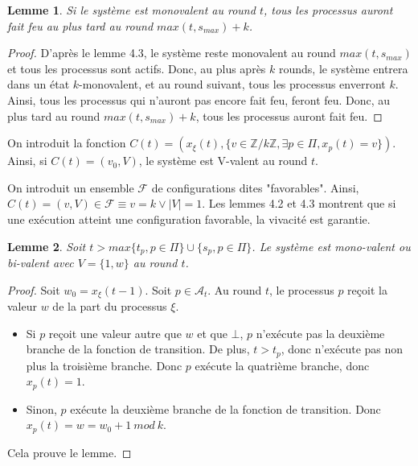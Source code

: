 \documentclass{article}
\newtheorem{lemma}{Lemme}[section]
\begin{document}
\begin{lemma}
	Si le système est monovalent au round $t$, tous les processus auront fait feu au plus tard au round $max(t, s_{max})+k$.
\end{lemma}
\begin{proof}
	D'après le lemme 4.3, le système reste monovalent au round $max(t, s_{max})$ et tous les processus sont actifs.
	Donc, au plus après $k$ rounds, le système entrera dans un état $k$-monovalent, et au round suivant, tous les processus enverront $k$.
	Ainsi, tous les processus qui n'auront pas encore fait feu, feront feu.
	Donc, au plus tard au round $max(t, s_{max})+k$, tous les processus auront fait feu.
\end{proof}

On introduit la fonction $C(t) = (x_\xi(t), \{v \in \mathds{Z}/k\mathds{Z}, \exists p \in \Pi, x_p(t) = v\})$.
Ainsi, si $C(t) = (v_0, V)$, le système est V-valent au round $t$.

On introduit un ensemble $\mathcal{F}$ de configurations dites "favorables".
Ainsi, $C(t) = (v, V) \in \mathcal{F} \equiv v = k \vee |V| = 1$.
Les lemmes 4.2 et 4.3 montrent que si une exécution atteint une configuration favorable, la vivacité est garantie.


\begin{lemma}
	Soit $t > max \{t_p, p \in \Pi\} \cup \{s_p, p \in \Pi\}$. Le système est mono-valent ou bi-valent avec $V = \{1, w\}$ au round $t$.
\end{lemma}
\begin{proof}
	Soit $w_0 = x_\xi(t-1)$. Soit $p \in \mathcal{A}_t$.
	Au round $t$, le processus $p$ reçoit la valeur $w$ de la part du processus $\xi$.
	\begin{itemize}
		\item Si $p$ reçoit une valeur autre que $w$ et que $\bot$,
			$p$ n'exécute pas la deuxième branche de la fonction de transition. De plus, $t > t_p$, donc n'exécute pas non plus la troisième branche.
			Donc $p$ exécute la quatrième branche, donc $x_p(t) = 1$.
		\item Sinon, $p$ exécute la deuxième branche de la fonction de transition. Donc $x_p(t) = w = w_0+1~mod~k$.
	\end{itemize}

	Cela prouve le lemme.
\end{proof}
\end{document}
